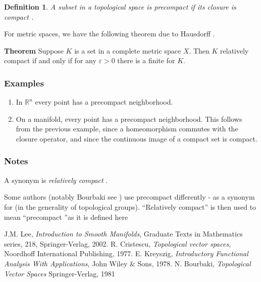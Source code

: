 \documentclass[12pt]{article}
\newcommand{\sR}[0]{\mathbb{R}}
\newtheorem{defn}{Definition}
\begin{document}
\begin{defn} A subset in a topological space is 
\emph{precompact} if its closure is compact \cite{lee}.
\end{defn}

For metric spaces, we have the following theorem due to Hausdorff
\cite{cristescu}.

{\bf Theorem} Suppose $K$ is a set in a complete metric space $X$.
Then $K$ relatively compact if and only if for any $\varepsilon>0$
there is a finite  for $K$.

\subsubsection*{Examples}
\begin{enumerate}
\item In $\sR^n$ every point has a precompact neighborhood.
\item On a manifold, every point has a precompact neighborhood. 
This follows from the previous example, since a homeomorphism 
commutes with the closure operator, and since the continuous image
of a compact set is compact. 
\end{enumerate}

\subsubsection*{Notes}
A synonym is \emph{relatively compact} \cite{cristescu, kreyszig}.

Some authors (notably Bourbaki see \cite{bour}) use precompact differently -  as a synonym for  (in the generality of topological groups). ``Relatively compact'' is then used to mean ``precompact ''as it is defined here
\begin{thebibliography}{9}
 J.M. Lee, \emph{Introduction to Smooth Manifolds},
Graduate Texts in Mathematics series, 218,
Springer-Verlag, 2002.
 R. Cristescu, \emph{Topological vector spaces},
Noordhoff International Publishing, 1977.
 E. Kreyszig,
\emph{Introductory Functional Analysis With Applications},
John Wiley \& Sons, 1978.
 N. Bourbaki, \emph{Topological Vector Spaces} Springer-Verlag, 1981
\end{thebibliography}
\end{document}
